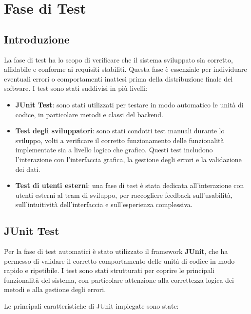 \documentclass[a4paper]{article}
\begin{document}
\section{Fase di Test}
\subsection{Introduzione}
La fase di test ha lo scopo di verificare che il sistema sviluppato sia corretto, affidabile e conforme ai requisiti stabiliti.
Questa fase è essenziale per individuare eventuali errori o comportamenti inattesi prima della distribuzione finale del software.
I test sono stati suddivisi in più livelli:

\begin{itemize}
    \item \textbf{JUnit Test}: sono stati utilizzati per testare in modo automatico le unità di codice, in particolare metodi e classi del backend.

    \item \textbf{Test degli sviluppatori}: sono stati condotti test manuali durante lo sviluppo, volti a verificare il corretto funzionamento delle funzionalità implementate sia a livello logico che grafico. Questi test includono l’interazione con l’interfaccia grafica, la gestione degli errori e la validazione dei dati.

    \item \textbf{Test di utenti esterni}: una fase di test è stata dedicata all’interazione con utenti esterni al team di sviluppo, per raccogliere feedback sull’usabilità, sull’intuitività dell’interfaccia e sull’esperienza complessiva.
\end{itemize}


\subsection{JUnit Test}
Per la fase di test automatici è stato utilizzato il framework \textbf{JUnit}, che ha permesso di validare il corretto comportamento delle unità di codice in modo rapido e ripetibile. I test sono stati strutturati per coprire le principali funzionalità del sistema, con particolare attenzione alla correttezza logica dei metodi e alla gestione degli errori.

Le principali caratteristiche di JUnit impiegate sono state:
\end{document}
